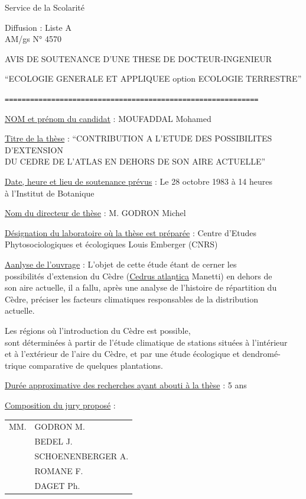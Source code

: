 Service de la Scolarité

Diffusion : Liste A\\
AM/gs \qquad N° 4570

\begin{center}
AVIS DE SOUTENANCE D'UNE THESE DE DOCTEUR-INGENIEUR

``ECOLOGIE GENERALE ET APPLIQUEE \quad option \quad ECOLOGIE TERRESTRE''

\texttt{============================================================}
\end{center}

\uline{NOM et prénom du candidat} : MOUFADDAL Mohamed

\uline{Titre de la thèse} : ``CONTRIBUTION A L'ETUDE DES POSSIBILITES D'EXTENSION\\
DU CEDRE DE L'ATLAS EN DEHORS DE SON AIRE ACTUELLE''

\uline{Date, heure et lieu de soutenance prévus} : Le 28 octobre 1983 à 14 heures\\
à l'Institut de Botanique

\uline{Nom du directeur de thèse} : M. GODRON Michel

\uline{Désignation du laboratoire où la thèse est préparée} : Centre d'Etudes\\
Phytosociologiques et écologiques Louis Emberger (CNRS)

\uline{Aanlyse de l'ouvrage} : L'objet de cette étude étant de cerner les\\
possibilités d'extension du Cèdre (\uline{Cedrus atla}n\uline{tica} Manetti) en dehors de\\
son aire actuelle, il a fallu, après une analyse de l'histoire de répartition du\\
Cèdre, préciser les facteurs climatiques responsables de la distribution\\
actuelle.

Les régions où l'introduction du Cèdre est possible,\\
sont déterminées à partir de l'étude climatique de stations situées à l'intérieur\\
et à l'extérieur de l'aire du Cèdre, et par une étude écologique et dendromé-\\
trique comparative de quelques plantations.

\uline{Durée approximative des recherches ayant abouti à la thèse} : 5 ans

\uline{Composition du jury proposé} : \begin{tabular}[t]{ll}
MM. & GODRON M.\\
& BEDEL J.\\
& SCHOENENBERGER A.\\
& ROMANE F.\\
& DAGET Ph.
\end{tabular}

